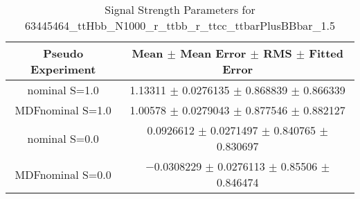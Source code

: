 \begin{table}
\centering
\caption{Signal Strength Parameters for 63445464\_ttHbb\_N1000\_r\_ttbb\_r\_ttcc\_ttbarPlusBBbar\_1.5}
\begin{tabular}{cc}
\toprule
Pseudo Experiment & Mean $\pm$ Mean Error $\pm$ RMS $\pm$ Fitted Error\\
\midrule
nominal S=1.0 & \num{1.13311} $\pm$ \num{0.0276135} $\pm$ \num{0.868839} $\pm$ \num{0.866339}\\
MDFnominal S=1.0 & \num{1.00578} $\pm$ \num{0.0279043} $\pm$ \num{0.877546} $\pm$ \num{0.882127}\\
nominal S=0.0 & \num{0.0926612} $\pm$ \num{0.0271497} $\pm$ \num{0.840765} $\pm$ \num{0.830697}\\
MDFnominal S=0.0 & \num{-0.0308229} $\pm$ \num{0.0276113} $\pm$ \num{0.85506} $\pm$ \num{0.846474}\\
\bottomrule
\end{tabular}
\end{table}